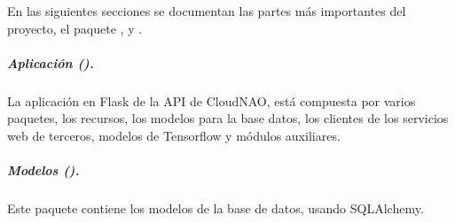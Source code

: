 En las siguientes secciones se documentan las partes más importantes del
proyecto, el paquete ,  y .


\subparagraph{Aplicación ().}
\label{\detokenize{chapter_two/desc_cloudnao:aplicacion-app}}\label{\detokenize{chapter_two/desc_cloudnao:module-app}}
La aplicación en Flask de la API de CloudNAO, está compuesta por varios paquetes,
los recursos, los modelos para la base datos, los clientes de los servicios web de
terceros, modelos de Tensorflow y módulos auxiliares.


\subparagraph{Modelos ().}
\label{\detokenize{chapter_two/desc_cloudnao:module-app.models}}\label{\detokenize{chapter_two/desc_cloudnao:modelos-models}}
Este paquete contiene los modelos de la base de datos, usando SQLAlchemy.
\label{\detokenize{chapter_two/desc_cloudnao:module-app.models.user_model}}\label{\detokenize{chapter_two/desc_cloudnao:module-user_model}}

